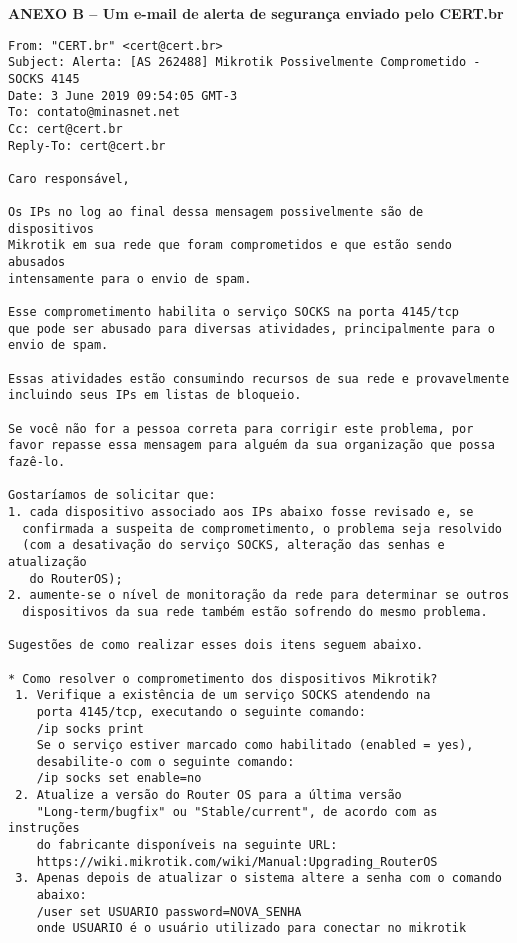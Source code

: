 \begin{center}
  \normalsize{\textbf{ANEXO B -- Um e-mail de alerta de segurança enviado pelo CERT.br}}
\end{center}

\pagestyle{empty} %

\begin{verbatim}
From: "CERT.br" <cert@cert.br>
Subject: Alerta: [AS 262488] Mikrotik Possivelmente Comprometido - SOCKS 4145
Date: 3 June 2019 09:54:05 GMT-3
To: contato@minasnet.net
Cc: cert@cert.br
Reply-To: cert@cert.br

Caro responsável,

Os IPs no log ao final dessa mensagem possivelmente são de dispositivos
Mikrotik em sua rede que foram comprometidos e que estão sendo abusados
intensamente para o envio de spam.

Esse comprometimento habilita o serviço SOCKS na porta 4145/tcp
que pode ser abusado para diversas atividades, principalmente para o
envio de spam.

Essas atividades estão consumindo recursos de sua rede e provavelmente
incluindo seus IPs em listas de bloqueio.

Se você não for a pessoa correta para corrigir este problema, por
favor repasse essa mensagem para alguém da sua organização que possa
fazê-lo.

Gostaríamos de solicitar que:
1. cada dispositivo associado aos IPs abaixo fosse revisado e, se
  confirmada a suspeita de comprometimento, o problema seja resolvido
  (com a desativação do serviço SOCKS, alteração das senhas e atualização
   do RouterOS);
2. aumente-se o nível de monitoração da rede para determinar se outros
  dispositivos da sua rede também estão sofrendo do mesmo problema.

Sugestões de como realizar esses dois itens seguem abaixo.

* Como resolver o comprometimento dos dispositivos Mikrotik?
 1. Verifique a existência de um serviço SOCKS atendendo na
    porta 4145/tcp, executando o seguinte comando:
    /ip socks print
    Se o serviço estiver marcado como habilitado (enabled = yes),
    desabilite-o com o seguinte comando:
    /ip socks set enable=no
 2. Atualize a versão do Router OS para a última versão
    "Long-term/bugfix" ou "Stable/current", de acordo com as instruções
    do fabricante disponíveis na seguinte URL:
    https://wiki.mikrotik.com/wiki/Manual:Upgrading_RouterOS
 3. Apenas depois de atualizar o sistema altere a senha com o comando
    abaixo:
    /user set USUARIO password=NOVA_SENHA
    onde USUARIO é o usuário utilizado para conectar no mikrotik


\end{verbatim}

